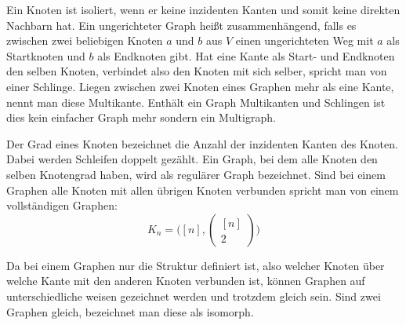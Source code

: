 Ein Knoten ist isoliert, wenn er keine inzidenten Kanten und somit keine direkten Nachbarn hat.\cite{knauer2015diskrete}
Ein ungerichteter Graph heißt zusammenhängend, falls es zwischen zwei beliebigen Knoten $a$ und $b$ aus $V$ einen ungerichteten Weg mit $a$ als Startknoten und $b$ als Endknoten gibt.\cite[36-38]{krumke2012graphentheoretische}
Hat eine Kante als Start- und Endknoten den selben Knoten, verbindet also den Knoten mit sich selber, spricht man von einer Schlinge.
Liegen zwischen zwei Knoten eines Graphen mehr als eine Kante, nennt man diese Multikante.
Enthält ein Graph Multikanten und Schlingen ist dies kein einfacher Graph mehr sondern ein Multigraph.\cite{felsner01}

Der Grad eines Knoten bezeichnet die Anzahl der inzidenten Kanten des Knoten.
Dabei werden Schleifen doppelt gezählt.\cite[Seite 13]{rahm2017}
Ein Graph, bei dem alle Knoten den selben Knotengrad haben, wird als regulärer Graph bezeichnet.\cite{felsner2012geometric}
Sind bei einem Graphen alle Knoten mit allen übrigen Knoten verbunden spricht man von einem vollständigen Graphen:
\[K_{n}=\big([n],\begin{pmatrix}
					 [n] \\ 2
\end{pmatrix}\big)\]

Da bei einem Graphen nur die Struktur definiert ist, also welcher Knoten über welche Kante mit den anderen Knoten verbunden ist, können Graphen auf unterschiedliche weisen gezeichnet werden und trotzdem gleich sein.
Sind zwei Graphen gleich, bezeichnet man diese als isomorph.\cite[Seite 22]{basicgraphtheory}

